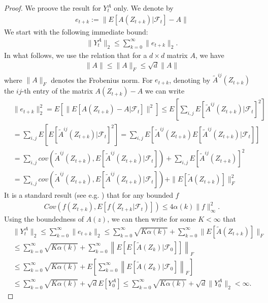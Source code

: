 \documentclass[11pt]{article}
\begin{document}
\begin{proof}
We proove the result for $Y_t^A$ only. We denote by
\begin{align*}
e_{t+k}:= \|E[A(Z_{t+k})|\mathcal{F}_t] -A \| 
\end{align*}
 We start with the following immediate bound:
\begin{align*}
\|Y_t^A\|_2 \leq \sum_{k=0}^\infty \|e_{t+k}\|_2.
\end{align*}
In what follows, we use the relation that for a $d\times d$ matrix $A$, we have
\begin{align*}
\|A\|\leq \|A\|_F\leq \sqrt{d}\|A\|
\end{align*}
where $\|A\|_F$ denotes the Frobenius norm.
For $e_{t+k}$, denoting by $\tilde{A}^{ij} (Z_{t+k})$ the $ij$-th entry of the matrix $A(Z_{t+k}) -A$ we can write
\begin{align*}
&\|e_{t+k}\|_2^2= E\left[ \| E[A(Z_{t+k})-A|\mathcal{F}_t] \|^2 \right]\leq E\left[  \sum_{i,j} E[\tilde{A}^{ij} (Z_{t+k})|\mathcal{F}_t ]^2 \right]\\
&= \sum_{i,j} E\left[ E[\tilde{A}^{ij} (Z_{t+k})|\mathcal{F}_t ]^2 \right]  = \sum_{i,j} E\left[ \tilde{A}^{ij} (Z_{t+k}) E[\tilde{A}^{ij} (Z_{t+k})|\mathcal{F}_t ]\right]\\
& =  \sum_{i,j} cov \left(  \tilde{A}^{ij} (Z_{t+k}), E[\tilde{A}^{ij} (Z_{t+k})|\mathcal{F}_t ] \right) +   \sum_{i,j} E\left[ \tilde{A}^{ij} (Z_{t+k})\right]^2\\
&=   \sum_{i,j} cov \left(  \tilde{A}^{ij} (Z_{t+k}), E[\tilde{A}^{ij} (Z_{t+k})|\mathcal{F}_t ] \right)+ \| E[\tilde{A}(Z_{t+k})]\|_F^2
\end{align*}
It is a standard result (see e.g. \cite{rio1993}) that for any bounded $f$
\begin{align*}
Cov(f(Z_{t+k}), E[f(Z_{t+k}|\mathcal{F}_t)]) \leq 4 \alpha(k) \|f\|^2_\infty.
\end{align*}
Using the boundedness of $A(z)$, we can then write for some $K<\infty$ that
\begin{align*}
&\|Y_t^A\|_2 \leq \sum_{k=0}^\infty \|e_{t+k}\|_2 \leq \sum_{k=0}^\infty \sqrt{K \alpha(k)} + \sum_{k=0}^\infty \| E[\tilde{A}(Z_{t+k})]\|_F \\
&\leq \sum_{k=0}^\infty \sqrt{K \alpha(k)} +  \sum_{k=0}^\infty \left\|E\left[ E[\tilde{A}(Z_{k})|\mathcal{F}_0] \right]\right\|_F \\
&\leq  \sum_{k=0}^\infty \sqrt{K \alpha(k)} + E\left[ \sum_{k=0}^\infty \left\| E[\tilde{A}(Z_k)|\mathcal{F}_0] \right\|_F  \right]\\
&\leq  \sum_{k=0}^\infty \sqrt{K \alpha(k)} + \sqrt{d}E[Y_0^A] \leq   \sum_{k=0}^\infty \sqrt{K \alpha(k)} +\sqrt{d} \|Y_0^A\|_2 <\infty.
\end{align*}
\end{proof}
\end{document}
